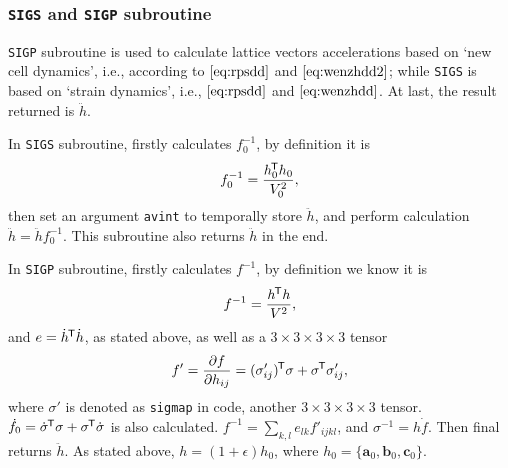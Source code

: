 \subsubsection{\texttt{SIGS} and \texttt{SIGP} subroutine}
\label{sssec:sigs&p}

\texttt{SIGP} subroutine is used to calculate lattice vectors accelerations
based on `new cell dynamics', i.e., according to $\eqref{eq:rpsdd}$ and
$\eqref{eq:wenzhdd2}$; while \texttt{SIGS} is based on `strain dynamics',
i.e., $\eqref{eq:rpsdd}$ and $\eqref{eq:wenzhdd}$.
At last, the result returned is $\ddot{h}$.

In \texttt{SIGS} subroutine,
firstly calculates $f_0^{-1}$, by definition it is
\begin{equation}
	f_0^{-1} = \frac{ h_0 ^{\mkern-1.5mu\mathsf{T}} h_0}{ V_0^2 },
\end{equation}
then set an argument \texttt{avint} to temporally store $\ddot{h}$,
and perform calculation $\ddot{h} = \ddot{h} f_0^{-1}$.
This subroutine also returns $\ddot{h}$ in the end.

In \texttt{SIGP} subroutine,
firstly calculates $f^{-1}$, by definition we know it is
\begin{equation}
	f^{-1} = \frac{ h ^{\mkern-1.5mu\mathsf{T}} h }{ V^2 },
\end{equation}
and $e = \dot{ h }^{\mkern-1.5mu\mathsf{T}} \dot{ h }$, as stated above, as well as
a $3\times 3 \times 3 \times 3$ tensor
\begin{equation}
	f ' = \frac{ \partial f }{ \partial h_{ij} } = (\sigma'_{ij})^{\mkern-1.5mu\mathsf{T}} \sigma
	+ \sigma ^{\mkern-1.5mu\mathsf{T}} \sigma'_{ij},
\end{equation}
where $\sigma'$ is denoted as \texttt{sigmap} in code, another $3\times 3
\times 3 \times 3$ tensor.
$\dot{f}_0 = \dot{ \sigma } ^{\mkern-1.5mu\mathsf{T}} \sigma + \sigma ^{\mkern-1.5mu\mathsf{T}} \dot{ \sigma }$ is
also calculated.
$f^{-1} = \sum_{k, l} e_{lk} f'_{ijkl}$, and $\sigma^{-1} = h \dot{ f }$.
Then final returns $\ddot{h}$. As stated above, $h = (1 + \epsilon) h_0$,
where $h_0 = \{ \bm{a}_0, \bm{b}_0, \bm{c}_0 \}$.

